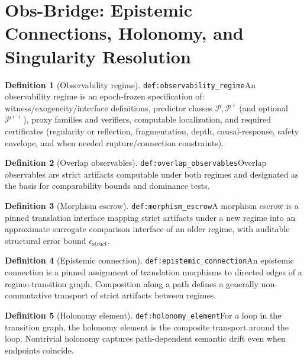 \documentclass[11pt]{article}
\theoremstyle{definition}
\newtheorem{definition}{Definition}
\theoremstyle{plain}
\newcommand{\lbl}[1]{\texttt{\footnotesize\nolinkurl{#1}}}
\newcommand{\DefLabel}[1]{\hfill{\small\lbl{#1}}}
\newcommand{\estr}{\epsilon_{\mathrm{struct}}}
\begin{document}
\section{Obs-Bridge: Epistemic Connections, Holonomy, and Singularity Resolution}\label{sec:bridge}
\begin{definition}[Observability regime]\DefLabel{def:observability_regime}\label{def:observability_regime}
An observability regime is an epoch-frozen specification of: witness/exogeneity/interface definitions, predictor classes $\mathcal{P},\mathcal{P}^+$ (and optional $\mathcal{P}^{++}$), proxy families and verifiers, computable localization, and required certificates (regularity or reflection, fragmentation, depth, causal-response, safety envelope, and when needed rupture/connection constraints).
\end{definition}

\begin{definition}[Overlap observables]\DefLabel{def:overlap_observables}\label{def:overlap_observables}
Overlap observables are strict artifacts computable under both regimes and designated as the basis for comparability bounds and dominance tests.
\end{definition}

\begin{definition}[Morphism escrow]\DefLabel{def:morphism_escrow}\label{def:morphism_escrow}
A morphism escrow is a pinned translation interface mapping strict artifacts under a new regime into an approximate surrogate comparison interface of an older regime, with auditable structural error bound $\estr$.
\end{definition}

\begin{definition}[Epistemic connection]\DefLabel{def:epistemic_connection}\label{def:epistemic_connection}
An epistemic connection is a pinned assignment of translation morphisms to directed edges of a regime-transition graph.
Composition along a path defines a generally non-commutative transport of strict artifacts between regimes.
\end{definition}

\begin{definition}[Holonomy element]\DefLabel{def:holonomy_element}\label{def:holonomy_element}
For a loop in the transition graph, the holonomy element is the composite transport around the loop.
Nontrivial holonomy captures path-dependent semantic drift even when endpoints coincide.
\end{definition}
\end{document}
